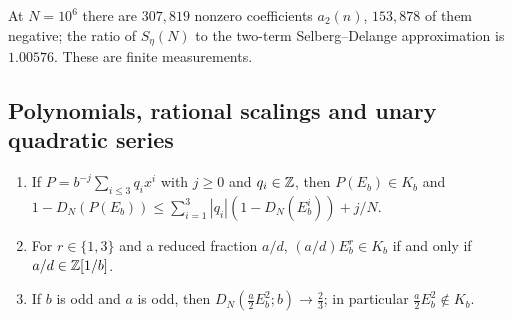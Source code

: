 \documentclass[11pt]{article}
\begin{document}
At $N=10^6$ there are $307{,}819$ nonzero coefficients $a_2(n)$, $153{,}878$ of them negative;
the ratio of $S_\eta(N)$ to the two-term Selberg--Delange approximation is $1.00576$. These are
finite measurements.

\subsection{Polynomials, rational scalings and unary quadratic series}\label{subsec:poly}

\begin{theorem}\label{thm:polyscal}
\leavevmode
\begin{enumerate}[label=\textup{(\alph*)},nosep]
\item If $P=b^{-j}\sum_{i\le3}q_ix^i$ with $j\ge0$ and $q_i\in\mathbb Z$, then $P(E_b)\in K_b$ and
$1-D_N(P(E_b))\le\sum_{i=1}^3|q_i|(1-D_N(E_b^i))+j/N$.
\item For $r\in\{1,3\}$ and a reduced fraction $a/d$, $(a/d)E_b^r\in K_b$ if and only if
$a/d\in\mathbb Z[1/b]$.
\item If $b$ is odd and $a$ is odd, then $D_N(\frac a2E_b^2;b)\to\frac23$; in particular
$\frac a2E_b^2\notin K_b$.
\end{enumerate}
\end{theorem}
\end{document}
